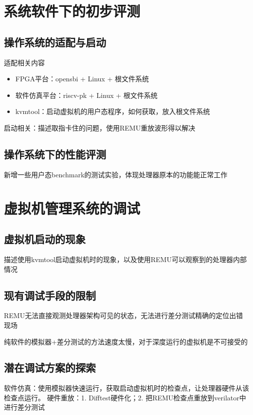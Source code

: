 \chapter{系统软件下的初步评测}

\section{操作系统的适配与启动}

适配相关内容
\begin{itemize}
    \item FPGA平台：opensbi + Linux + 根文件系统
    \item 软件仿真平台：riscv-pk + Linux + 根文件系统
    \item kvmtool：启动虚拟机的用户态程序，如何获取，放入根文件系统
\end{itemize}

启动相关：描述取指卡住的问题，使用REMU重放波形得以解决

\section{操作系统下的性能评测}

新增一些用户态benchmark的测试实验，体现处理器原本的功能能正常工作

\chapter{虚拟机管理系统的调试}

\section{虚拟机启动的现象}
描述使用kvmtool启动虚拟机时的现象，以及使用REMU可以观察到的处理器内部情况

\section{现有调试手段的限制}
REMU无法直接观测处理器架构可见的状态，无法进行差分测试精确的定位出错现场

纯软件的模拟器+差分测试的方法速度太慢，对于深度运行的虚拟机是不可接受的

\section{潜在调试方案的探索}
软件仿真：使用模拟器快速运行，获取启动虚拟机时的检查点，让处理器硬件从该检查点运行。
硬件重放：1. Difftest硬件化；2. 把REMU检查点重放到verilator中进行差分测试
